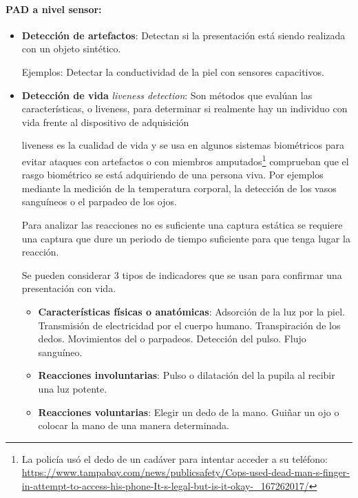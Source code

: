 \paragraph{PAD a nivel sensor:}
\begin{itemize}
    \item 
    \textbf{Detección de artefactos}: Detectan si la presentación está siendo realizada con un objeto sintético.
    
    Ejemplos: Detectar la conductividad de la piel con sensores capacitivos.
    \item 
    \textbf{Detección de vida} \textit{\Gls{liveness detection}}: Son métodos que evalúan las características, o \gls{liveness}, para determinar si realmente hay un individuo con vida frente al dispositivo de adquisición
    
    \Gls{liveness} es la cualidad de vida y se usa en algunos sistemas biométricos para evitar ataques con artefactos o con miembros amputados\footnote{La policía usó el dedo de un cadáver para intentar acceder a su teléfono: \href{https://www.tampabay.com/news/publicsafety/Cops-used-dead-man-s-finger-in-attempt-to-access-his-phone-It-s-legal-but-is-it-okay-\_167262017/}{https://www.tampabay.com/news/publicsafety/Cops-used-dead-man-s-finger-in-attempt-to-access-his-phone-It-s-legal-but-is-it-okay-\_167262017/}}  \cite{bhattacharjee2018spoofing} comprueban que el rasgo biométrico se está adquiriendo de una persona viva. Por ejemplos mediante la medición de la temperatura corporal, la detección de los vasos sanguíneos o el parpadeo de los ojos.
    
    Para analizar las reacciones no es suficiente una captura estática se requiere una captura que dure un periodo de tiempo suficiente para que tenga lugar la reacción.
    
    Se pueden considerar $3$ tipos de indicadores que se usan para confirmar una presentación con vida.

    \begin{itemize}
      \item 
      \textbf{Características físicas o anatómicas}: Adsorción de la luz por la piel. Transmisión de electricidad por el cuerpo humano. Transpiración de los dedos. Movimientos del  o parpadeos. Detección del pulso. Flujo sanguíneo.
      \item
      \textbf{Reacciones involuntarias}: Pulso o dilatación del la pupila al recibir una luz potente.
      \item
      \textbf{Reacciones voluntarias}: Elegir un dedo de la mano. Guiñar un ojo o colocar la mano de una manera determinada.
    \end{itemize}
    

\end{itemize}
